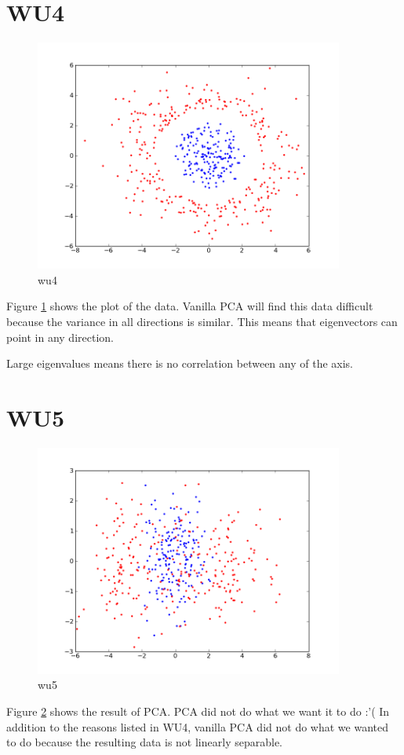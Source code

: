 \section*{WU4}
\begin{figure}[here]
	\center
	\caption{wu4}
	\label{fig:wu4}
	\includegraphics[width=4.0in]{img/wu4.png}
\end{figure}
Figure \ref{fig:wu4} shows the plot of the data. 
Vanilla PCA will find this data difficult because the variance in all directions is similar. This means that eigenvectors can point in any direction.

Large eigenvalues means there is no correlation between any of the axis. 

\section*{WU5}
\begin{figure}[here]
\label{fig:wu5}
	\center
	\caption{wu5}
	\includegraphics[width=4.0in]{img/wu5.png}
\end{figure}
Figure \ref{fig:wu5} shows the result of PCA. 
PCA did not do what we want it to do :'(
In addition to the reasons listed in WU4, vanilla PCA 
did not do what we wanted to do because the resulting data 
is not linearly separable.


